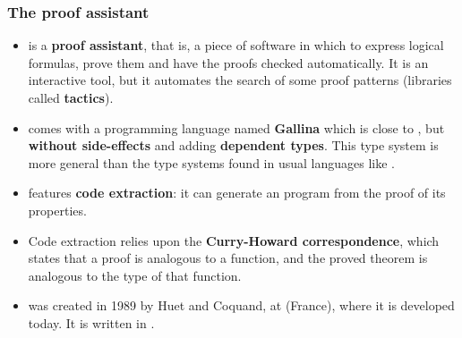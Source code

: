 \documentclass[compress,dvipdfmx]{beamer}
\begin{document}
\begin{frame}
  \frametitle{The proof assistant \Coq}

  \begin{itemize}

    \item \Coq is a \textbf{proof assistant}, that is, a piece of
      software in which to express logical formulas, prove them and
      have the proofs checked automatically. It is an interactive
      tool, but it automates the search of some proof patterns
      (libraries called \textbf{tactics}).

    \item \Coq comes with a programming language named
      \textbf{Gallina} which is close to \OCaml, but \textbf{without
        side\hyp{}effects} and adding \textbf{dependent types}. This
      type system is more general than the type systems found in usual
      languages like \Java.

    \item \Coq features \textbf{code extraction}: it can generate an
      \OCaml program from the proof of its properties.


    \item Code extraction relies upon the \textbf{Curry\hyp{}Howard
      correspondence}, which states that a proof is analogous to a
      function, and the proved theorem is analogous to the type of
      that function.

    \item \Coq was created in 1989 by Huet and Coquand, at \Inria
      (France), where it is developed today. It is written in \OCaml.

  \end{itemize}

\end{frame}
\end{document}
